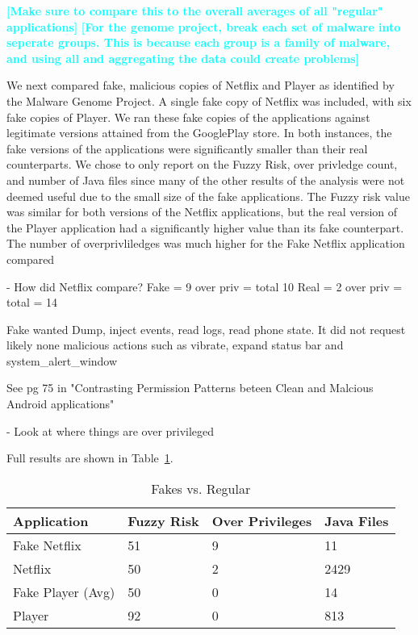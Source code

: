 \documentclass{sig-alternate}
\newcommand{\todo}[1]{\textcolor{cyan}{\textbf{[#1]}}}
\begin{document}
\todo{Make sure to compare this to the overall averages of all "regular" applications}
\todo{For the genome project, break each set of malware into seperate groups. This is because each group is a family of malware, and using all and aggregating the data could create problems}




We next compared fake, malicious copies of Netflix and Player as identified by the Malware Genome Project. A single fake copy of Netflix was included, with six fake copies of Player. We ran these fake copies of the applications against legitimate versions attained from the GooglePlay store. In both instances, the fake versions of the applications were significantly smaller than their real counterparts. We chose to only report on the Fuzzy Risk, over privledge count, and number of Java files since many of the other results of the analysis were not deemed useful due to the small size of the fake applications. The Fuzzy risk value was similar for both versions of the Netflix applications, but the real version of the Player application had a significantly higher value than its fake counterpart. The number of overprivliledges was much higher for the Fake Netflix application compared




- How did Netflix compare?
Fake = 9 over priv = total 10
Real = 2 over priv = total = 14


Fake wanted Dump, inject events, read logs, read phone state. It did not request likely none malicious actions such as vibrate, expand status bar and system\_alert\_window

See pg 75 in "Contrasting Permission Patterns beteen Clean and Malcious Android applications"


- Look at where things are over privileged

Full results are shown in Table~\ref{Table:fakesvsRegular}.



\begin{center}

\begin{table}[ht]
\caption{Fakes vs. Regular}
\label{Table:fakesvsRegular}
  \begin{tabular}{ l | l | l | l }

    \bfseries Application  & \bfseries Fuzzy Risk  & \bfseries Over Privileges & \bfseries Java Files \\ \hline
    Fake Netflix & 51 & 9 & 11 \\ \hline
    Netflix & 50 & 2 & 2429 \\ \hline \hline
    Fake Player (Avg) & 50 & 0 & 14 \\ \hline
    Player & 92 & 0 & 813 \\ 
  \end{tabular}
\end{table}
\end{center}
\end{document}

